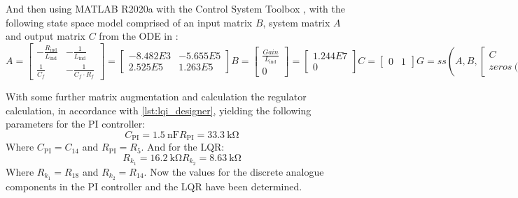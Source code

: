 And then using MATLAB R2020a with the Control System Toolbox \cite{matlab_control_toolbox}, with the following state space model comprised of an input matrix $B$, system matrix $A$ and output matrix $C$ from the ODE in \cite{multivar_ctrl_loops_for_SM_audio_systems}:
\begin{subequations}
	\begin{equation}
		A = \begin{bmatrix}	-\frac{R_{\mathrm{ind}}}{L_{\mathrm{ind}}} & -\frac{1}{L_{\mathrm{ind}}} \\ \frac{1}{C_{f}} & -\frac{1}{C_{f}\cdot R_{f}} \end{bmatrix} = \begin{bmatrix} -8.482E3 & -5.655E5 \\ 2.525E5 & 1.263E5 \end{bmatrix}
	\end{equation}	
	\begin{equation}
		B = \begin{bmatrix} \frac{Gain}{L_{\mathrm{ind}}} \\ 0 \end{bmatrix} = \begin{bmatrix} 1.244E7 \\ 0 \end{bmatrix}
	\end{equation}
	\begin{equation}
		C = \begin{bmatrix} 0 & 1 \end{bmatrix}
	\end{equation}
	\begin{equation}
		G = ss \left( A, B, \begin{bmatrix} C \\ zeros(2) \end{bmatrix}, 0 \right) 
	\end{equation}
\end{subequations} 

With some further matrix augmentation and calculation the regulator calculation, in accordance with \autoref{lst:lqi_designer}, yielding the following parameters for the PI controller:
\begin{subequations}
	\begin{equation}
		C_{\mathrm{PI}} = \SI{1.5}{\nano\farad}
	\end{equation}
	\begin{equation}
		R_{\mathrm{PI}} = \SI{33.3}{\kilo\ohm}
	\end{equation}
\end{subequations}
Where $C_{\mathrm{PI}} = C_{14}$ and $R_{\mathrm{PI}}=R_{5}$. And for the LQR:
\begin{subequations}
	\begin{equation}
		R_{k_{1}} = \SI{16.2}{\kilo\ohm}
	\end{equation}
	\begin{equation}
		R_{k_{2}} = \SI{8.63}{\kilo\ohm}
	\end{equation}
\end{subequations}
Where $R_{k_{1}}=R_{18}$ and $R_{k_{2}}=R_{14}$. Now the values for the discrete analogue components in the PI controller and the LQR have been determined.

